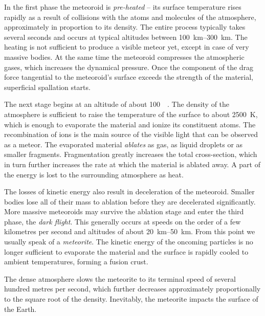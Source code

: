         In the first phase the meteoroid is \emph{pre-heated} -- its surface temperature rises rapidly
        as a result of collisions with the atoms and molecules of the atmosphere, approximately in proportion to its density.
        The entire process typically takes several seconds and occurs at typical altitudes
        between \SIrange{100}{300}{\kilo\metre}. The heating is not sufficient to produce a visible meteor yet,
        except in case of very massive bodies. At the same time the meteoroid compresses
        the atmospheric gases, which increases the dynamical pressure. Once the component of the drag force
        tangential to the meteoroid's surface exceeds the strength of the material,
        superficial spallation starts.

        The next stage begins at an altitude of about \SI{100}{\kilo\metres}.
        The density of the atmosphere is sufficient to raise the temperature of the surface
        to about \SI{2500}{\kelvin}, which is enough to evaporate the material and ionize its constituent atoms.
        The recombination of ions is the main source of the visible light that can be observed as a meteor.
        The evaporated material \emph{ablates} as gas, as liquid droplets or as smaller fragments.
        Fragmentation greatly increases the total cross-section, which in turn
        further increases the rate at which the material is ablated away.
        A part of the energy is lost to the surrounding atmosphere as heat.

        The losses of kinetic energy also result in deceleration of the meteoroid.
        Smaller bodies lose all of their mass to ablation before they are decelerated significantly.
        More massive meteoroids may survive the ablation stage and enter the third phase, the \emph{dark flight}.
        This generally occurs at speeds on the order of a few kilometres per second and altitudes of about \SIrange{20}{50}{\kilo\metre}.
        From this point we usually speak of a \emph{meteorite}.
        The kinetic energy of the oncoming particles is no longer sufficient to evaporate the material
        and the surface is rapidly cooled to ambient temperatures, forming a fusion crust.

        The dense atmosphere slows the meteorite to its terminal speed of several hundred metres per second,
        which further decreases approximately proportionally to the square root of the density.
        Inevitably, the meteorite impacts the surface of the Earth.

